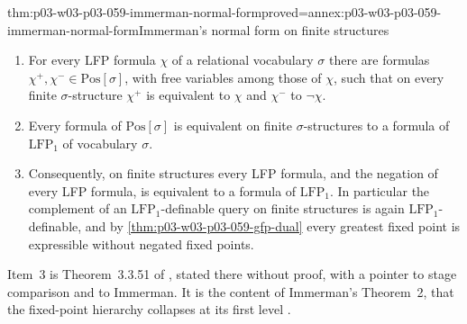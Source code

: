 \begin{hbtheorem}{thm:p03-w03-p03-059-immerman-normal-form}{proved=annex:p03-w03-p03-059-immerman-normal-form}{Immerman's normal form on finite structures}
\begin{enumerate}
 \item For every LFP formula \(\chi\) of a relational vocabulary
       \(\sigma\) there are formulas \(\chi^+,\chi^-\in\mathrm{Pos}[\sigma]\),
       with free variables among those of \(\chi\), such that on every
       finite \(\sigma\)-structure \(\chi^+\) is equivalent to \(\chi\) and
       \(\chi^-\) to \(\neg\chi\).
 \item Every formula of \(\mathrm{Pos}[\sigma]\) is equivalent on finite
       \(\sigma\)-structures to a formula of \(\mathrm{LFP}_1\) of
       vocabulary \(\sigma\).
 \item Consequently, on finite structures every LFP formula, and the
       negation of every LFP formula, is equivalent to a formula of
       \(\mathrm{LFP}_1\). In particular the complement of an
       \(\mathrm{LFP}_1\)-definable query on finite structures is again
       \(\mathrm{LFP}_1\)-definable, and by
       \cref{thm:p03-w03-p03-059-gfp-dual} every greatest fixed point is
       expressible without negated fixed points.
\end{enumerate}
Item~3 is Theorem~3.3.51 of \cite[p.~176]{Gradel2007FMTDescriptiveChapter}, stated there
without proof, with a pointer to stage comparison and to Immerman. It is
the content of Immerman's Theorem~2, that the fixed-point hierarchy
collapses at its first level \cite[pp.~87, 94]{Immerman1986}.
\end{hbtheorem}

